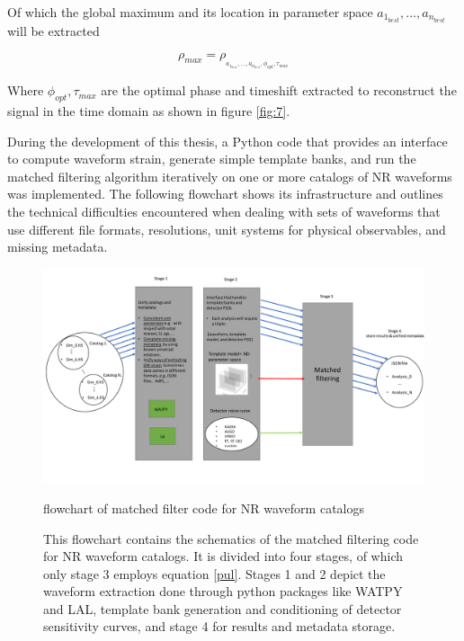 Of which the global maximum and its location in parameter space $a_{1_{best}},...,a_{n_{best}}$ will be extracted 

\begin{equation}
\rho_{max} = \rho_{_{a_{1_{best}},...,a_{n_{best}},\phi_{opt},\tau_{max}}}
\end{equation}

Where $\phi_{opt},\tau_{max}$ are the optimal phase and timeshift extracted to reconstruct the signal in the time domain as shown in figure \ref{fig:7}. 

During the development of this thesis, a Python code that provides an interface to compute waveform strain, generate simple template banks, and run the matched filtering algorithm iteratively on one or more catalogs of NR waveforms was implemented. The following flowchart shows its infrastructure and outlines the technical difficulties encountered when dealing with sets of waveforms that use different file formats, resolutions, unit systems for physical observables, and missing metadata.


\newpage


\begin{figure}
\begin{center}
\includegraphics[width=\textwidth, angle=0]{images/cat_search.pdf}
\captionsetup{width=0.8\textwidth}
\caption{flowchart of matched filter code for NR waveform catalogs}
\caption*{This flowchart contains the schematics of the matched filtering code for NR waveform catalogs\cite{}. It is divided into four stages, of which only stage 3 employs equation \ref{pul}. Stages 1 and 2 depict the waveform extraction done through python packages like WATPY and LAL, template bank generation and conditioning of detector sensitivity curves, and stage 4 for results and metadata storage.}
\label{fig:19}
\end{center}
\end{figure}

